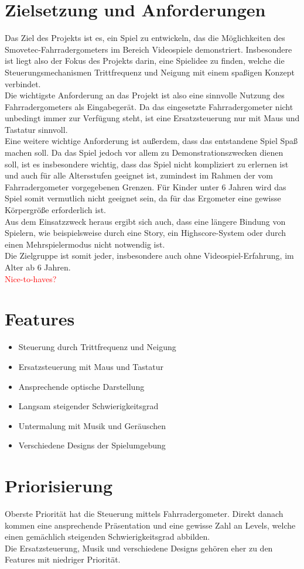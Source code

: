 \section{Zielsetzung und Anforderungen}
Das Ziel des Projekts ist es, ein Spiel zu entwickeln, das die Möglichkeiten des Smovetec-Fahrradergometers im Bereich Videospiele demonstriert. Insbesondere ist liegt also der Fokus des Projekts darin, eine Spielidee zu finden, welche die Steuerungsmechanismen Trittfrequenz und Neigung mit einem spaßigen Konzept verbindet.\\
Die wichtigste Anforderung an das Projekt ist also eine sinnvolle Nutzung des Fahrradergometers als Eingabegerät. Da das eingesetzte Fahrradergometer nicht unbedingt immer zur Verfügung steht, ist eine Ersatzsteuerung nur mit Maus und Tastatur sinnvoll.\\
Eine weitere wichtige Anforderung ist außerdem, dass das entstandene Spiel Spaß machen soll. Da das Spiel jedoch vor allem zu Demonstrationszwecken dienen soll, ist es insbesondere wichtig, dass das Spiel nicht kompliziert zu erlernen ist und auch für alle Altersstufen geeignet ist, zumindest im Rahmen der vom Fahrradergometer vorgegebenen Grenzen. Für Kinder unter 6 Jahren wird das Spiel somit vermutlich nicht geeignet sein, da für das Ergometer eine gewisse Körpergröße erforderlich ist.\\
Aus dem Einsatzzweck heraus ergibt sich auch, dass eine längere Bindung von Spielern, wie beispielsweise durch eine Story, ein Highscore-System oder durch einen Mehrspielermodus nicht notwendig ist.\\
Die Zielgruppe ist somit jeder, insbesondere auch ohne Videospiel-Erfahrung, im Alter ab 6 Jahren.\\
\textcolor{red}{Nice-to-haves?}
\section{Features}
\begin{itemize}
\item Steuerung durch Trittfrequenz und Neigung
\item Ersatzsteuerung mit Maus und Tastatur
\item Ansprechende optische Darstellung
\item Langsam steigender Schwierigkeitsgrad
\item Untermalung mit Musik und Geräuschen
\item Verschiedene Designs der Spielumgebung
\end{itemize}


\section{Priorisierung}
Oberste Priorität hat die Steuerung mittels Fahrradergometer. Direkt danach kommen eine ansprechende Präsentation und eine gewisse Zahl an Levels, welche einen gemächlich steigenden Schwierigkeitsgrad abbilden.\\
Die Ersatzsteuerung, Musik und verschiedene Designs gehören eher zu den Features mit niedriger Priorität.